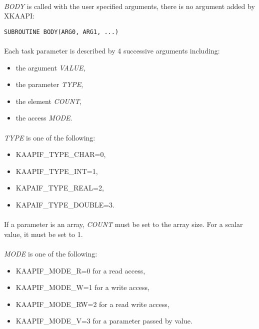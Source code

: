 \documentclass[a4paper, 11pt]{article}
\begin{document}
\paragraph{}
\textit{BODY} is called with the user specified arguments, there is no
argument added by XKAAPI:\\
\begin{small}
\lstset{language=C}
\begin{lstlisting}[frame=tb]
SUBROUTINE BODY(ARG0, ARG1, ...)
\end{lstlisting}
\end{small}

\paragraph{}
Each task parameter is described by 4 successive arguments including:
\begin{itemize}
\item the argument \textit{VALUE},
\item the parameter \textit{TYPE},
\item the element \textit{COUNT},
\item the access \textit{MODE}.
\end{itemize}

\paragraph{}
\textit{TYPE} is one of the following:
\begin{itemize}
\item KAAPIF\_TYPE\_CHAR=0,
\item KAAPIF\_TYPE\_INT=1,
\item KAPAIF\_TYPE\_REAL=2,
\item KAPAIF\_TYPE\_DOUBLE=3.
\end{itemize}

\paragraph{}
If a parameter is an array, \textit{COUNT} must be set to the array size.
For a scalar value, it must be set to 1.

\paragraph{}
\textit{MODE} is one of the following:
\begin{itemize}
\item KAAPIF\_MODE\_R=0 for a read access,
\item KAAPIF\_MODE\_W=1 for a write access,
\item KAAPIF\_MODE\_RW=2 for a read write access,
\item KAAPIF\_MODE\_V=3 for a parameter passed by value.
\end{itemize}
\end{document}
